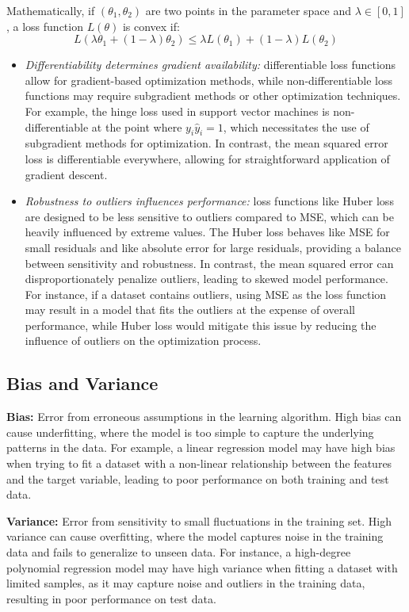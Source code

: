 \documentclass[
  letterpaper,
  DIV=11,
  numbers=noendperiod]{scrreprt}
\begin{document}
Mathematically, if \((\theta_1, \theta_2)\) are two points in the
parameter space and \(\lambda \in [0, 1]\), a loss function
\(L(\theta)\) is convex if:
\[L(\lambda \theta_1 + (1 - \lambda) \theta_2) \leq \lambda L(\theta_1) + (1 - \lambda) L(\theta_2)\]

\begin{itemize}
\item
  \emph{Differentiability determines gradient availability:}
  differentiable loss functions allow for gradient-based optimization
  methods, while non-differentiable loss functions may require
  subgradient methods or other optimization techniques. For example, the
  hinge loss used in support vector machines is non-differentiable at
  the point where \(y_i \hat{y}_i = 1\), which necessitates the use of
  subgradient methods for optimization. In contrast, the mean squared
  error loss is differentiable everywhere, allowing for straightforward
  application of gradient descent.
\item
  \emph{Robustness to outliers influences performance:} loss functions
  like Huber loss are designed to be less sensitive to outliers compared
  to MSE, which can be heavily influenced by extreme values. The Huber
  loss behaves like MSE for small residuals and like absolute error for
  large residuals, providing a balance between sensitivity and
  robustness. In contrast, the mean squared error can disproportionately
  penalize outliers, leading to skewed model performance. For instance,
  if a dataset contains outliers, using MSE as the loss function may
  result in a model that fits the outliers at the expense of overall
  performance, while Huber loss would mitigate this issue by reducing
  the influence of outliers on the optimization process.
\end{itemize}

\subsection{Bias and Variance}\label{bias-and-variance}

\textbf{Bias:} Error from erroneous assumptions in the learning
algorithm. High bias can cause underfitting, where the model is too
simple to capture the underlying patterns in the data. For example, a
linear regression model may have high bias when trying to fit a dataset
with a non-linear relationship between the features and the target
variable, leading to poor performance on both training and test data.

\textbf{Variance:} Error from sensitivity to small fluctuations in the
training set. High variance can cause overfitting, where the model
captures noise in the training data and fails to generalize to unseen
data. For instance, a high-degree polynomial regression model may have
high variance when fitting a dataset with limited samples, as it may
capture noise and outliers in the training data, resulting in poor
performance on test data.
\end{document}
